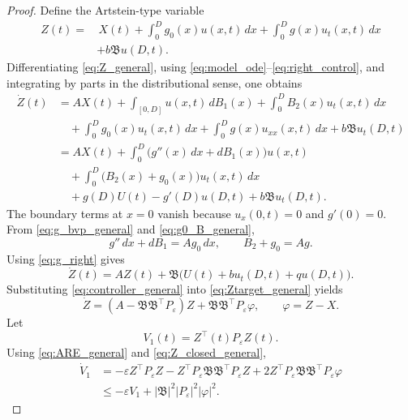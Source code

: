 \documentclass[journal]{IEEEtran}
\newcommand{\eps}{\varepsilon}
\newcommand{\Bcal}{\mathfrak B}
\newcommand{\abs}[1]{\left|#1\right|}
\begin{document}
\begin{proof}
Define the Artstein-type variable
\begin{equation}
\begin{aligned}
 Z(t)=&\,X(t)+\int_0^D g_0(x)u(x,t)\,dx
 +\int_0^D g(x)u_t(x,t)\,dx\\
 &+b\Bcal u(D,t).
\end{aligned}\label{eq:Z_general}
\end{equation}
Differentiating \eqref{eq:Z_general}, using \eqref{eq:model_ode}--\eqref{eq:right_control}, and integrating by parts in the distributional sense, one obtains
\begin{align}
 \dot Z(t)&=AX(t)+\int_{[0,D]}u(x,t)\,dB_1(x)
 +\int_0^D B_2(x)u_t(x,t)\,dx\nonumber\\
&\quad +\int_0^D g_0(x)u_t(x,t)\,dx
 +\int_0^D g(x)u_{xx}(x,t)\,dx
 +b\Bcal u_t(D,t)\nonumber\\
&=AX(t)+\int_0^D \big(g''(x)\,dx+dB_1(x)\big)u(x,t)\nonumber\\
&\quad +\int_0^D\big(B_2(x)+g_0(x)\big)u_t(x,t)\,dx\nonumber\\
&\quad +g(D)U(t)-g'(D)u(D,t)+b\Bcal u_t(D,t).
\end{align}
The boundary terms at $x=0$ vanish because $u_x(0,t)=0$ and $g'(0)=0$. From \eqref{eq:g_bvp_general} and \eqref{eq:g0_B_general},
\begin{equation}
 g''\,dx+dB_1=A g_0\,dx,
 \qquad B_2+g_0=Ag.
\end{equation}
Using \eqref{eq:g_right} gives
\begin{equation}
 \dot Z(t)=AZ(t)+\Bcal\big(U(t)+bu_t(D,t)+qu(D,t)\big).
 \label{eq:Ztarget_general}
\end{equation}
Substituting \eqref{eq:controller_general} into \eqref{eq:Ztarget_general} yields
\begin{equation}
 \dot Z=(A-\Bcal\Bcal^\top P_\eps)Z+
 \Bcal\Bcal^\top P_\eps\varphi,
 \qquad \varphi=Z-X.\label{eq:Z_closed_general}
\end{equation}
Let
\begin{equation}
 V_1(t)=Z^\top(t)P_\eps Z(t).\label{eq:V1_def}
\end{equation}
Using \eqref{eq:ARE_general} and \eqref{eq:Z_closed_general},
\begin{align}
 \dot V_1
&=-\eps Z^\top P_\eps Z-Z^\top P_\eps\Bcal\Bcal^\top P_\eps Z
 +2Z^\top P_\eps\Bcal\Bcal^\top P_\eps\varphi\nonumber\\
&\le -\eps V_1+
 \abs{\Bcal}^2\abs{P_\eps}^2\abs{\varphi}^2.
 \label{eq:V1dot_pre}
\end{align}


\end{proof}
\end{document}
